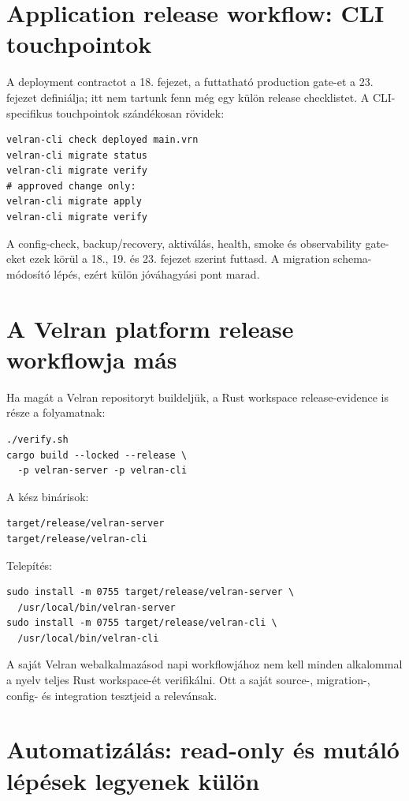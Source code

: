 \section{Application release workflow: CLI touchpointok}

A deployment contractot a 18. fejezet, a futtatható production gate-et a 23. fejezet definiálja; itt nem tartunk fenn még egy külön release checklistet. A CLI-specifikus touchpointok szándékosan rövidek:

\begin{lstlisting}
velran-cli check deployed main.vrn
velran-cli migrate status
velran-cli migrate verify
# approved change only:
velran-cli migrate apply
velran-cli migrate verify
\end{lstlisting}

A config-check, backup/recovery, aktiválás, health, smoke és observability gate-eket ezek körül a 18., 19. és 23. fejezet szerint futtasd. A migration  schema-módosító lépés, ezért külön jóváhagyási pont marad.

\section{A Velran platform release workflowja más}

Ha magát a Velran repositoryt buildeljük, a Rust workspace release-evidence is része a folyamatnak:

\begin{lstlisting}
./verify.sh
cargo build --locked --release \
  -p velran-server -p velran-cli
\end{lstlisting}

A kész binárisok:

\begin{lstlisting}
target/release/velran-server
target/release/velran-cli
\end{lstlisting}

Telepítés:

\begin{lstlisting}
sudo install -m 0755 target/release/velran-server \
  /usr/local/bin/velran-server
sudo install -m 0755 target/release/velran-cli \
  /usr/local/bin/velran-cli
\end{lstlisting}

A saját Velran webalkalmazásod napi workflowjához nem kell minden alkalommal a nyelv teljes Rust workspace-ét verifikálni. Ott a saját source-, migration-, config- és integration tesztjeid a relevánsak.

\section{Automatizálás: read-only és mutáló lépések legyenek külön}

